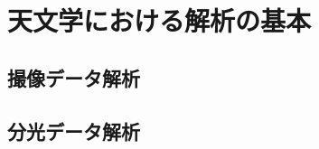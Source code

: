 \chapter{天文学における解析の基本} %
\label{chap:fandamentals_of_analysis}

\section{撮像データ解析} %
\label{sect:photo_ana}

\section{分光データ解析} %
\label{sect:spec_ana}